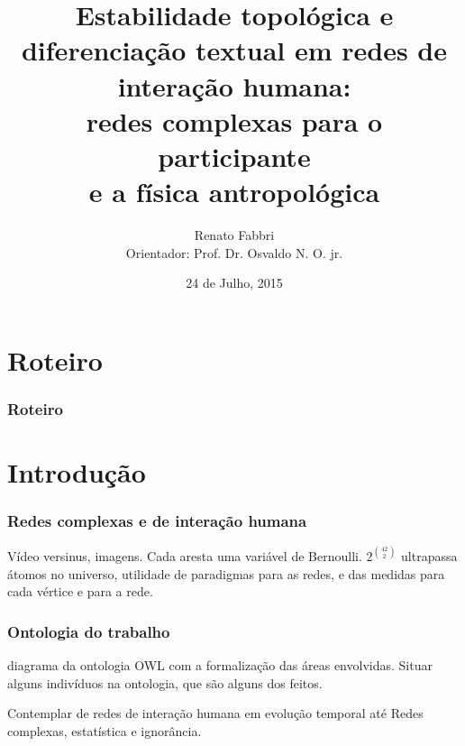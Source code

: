 \documentclass[10pt]{beamer}
\begin{document}
\title {\bfseries{\sc\large Estabilidade topológica e diferenciação textual
em redes de interação humana: \\
redes complexas para o participante\\
e a física antropológica
}}
\author[Renato Fabbri]{\small {Renato Fabbri\\
Orientador: Prof. Dr. Osvaldo N. O. jr.}}
\date{\small 24 de Julho, 2015} 
\begin{frame}
\titlepage
\end{frame}
\section*{Roteiro}
\begin{frame}
\frametitle{Roteiro}  
\tableofcontents
\end{frame}

\section{Introdução}
\begin{frame}
\frametitle{Redes complexas e de interação humana}
Vídeo versinus, imagens.
Cada aresta uma variável de Bernoulli.
$2^{42 \choose 2}$ ultrapassa átomos no universo,
utilidade de paradigmas para as redes,
e das medidas para cada vértice e para a rede.
\end{frame}

\begin{frame}
\frametitle{Ontologia do trabalho}
diagrama da ontologia OWL com a formalização das
áreas envolvidas. Situar alguns indivíduos na ontologia,
que são alguns dos feitos.

Contemplar de redes de interação humana em evolução temporal até Redes complexas, estatística e ignorância.
\end{frame}
\end{document}
